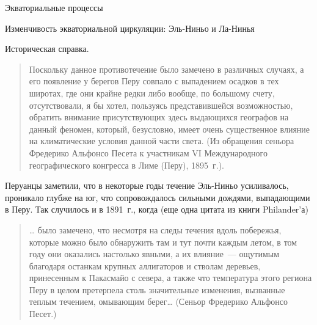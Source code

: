 \begin{chapter}{Экваториальные процессы}
\begin{section}{Изменчивость экваториальной циркуляции: Эль-Ниньо и Ла-Нинья}
\begin{paragraph}{Историческая справка.}
\begin{quotation}
Поскольку данное противотечение было замечено в различных случаях,
а его появление у берегов Перу совпало с выпадением осадков в тех широтах,
где они крайне редки либо вообще, по большому счету, отсутствовали, 
я бы хотел, пользуясь представившейся возможностью, обратить внимание 
присутствующих здесь выдающихся географов на данный феномен, который,
безусловно, имеет очень существенное влияние на климатические условия данной
части света. (Из обращения сеньора Фредерико Альфонсо Песета к участникам
VI Международного географического конгресса в Лиме (Перу), 1895~г.).
%
\end{quotation}

Перуанцы заметили, что в некоторые годы течение Эль-Ниньо усиливалось,
проникало глубже на юг, что сопровождалось сильными дождями, выпадающими 
в Перу. Так случилось и в 1891~г., когда (еще одна цитата из книги
Philander'а)
%
\begin{quotation}
\ldots{} было замечено, что несмотря на следы течения вдоль побережья, которые
можно было обнаружить там и тут почти каждым летом, в том году они оказались
настолько явными, а их влияние~--- ощутимым благодаря останкам крупных
аллигаторов и стволам деревьев, принесенным к Пакасмайо с севера, 
а также что температура этого региона Перу в целом претерпела столь 
значительные изменения, вызванные теплым течением, омывающим берег\ldots{} 
(Сеньор Фредерико Альфонсо Песет.)
%


\end{quotation}
\end{paragraph}
\end{section}
\end{chapter}
